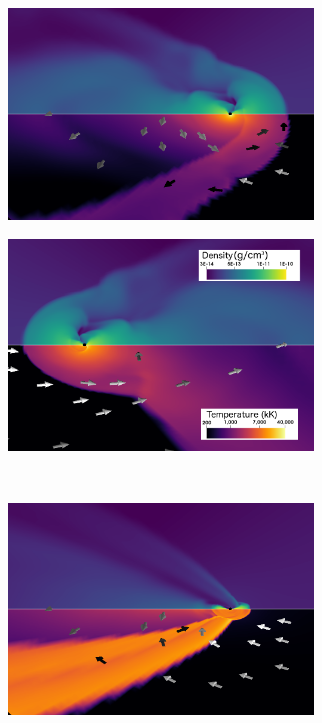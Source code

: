\documentclass{aa}
\begin{document}
\begin{figure}
\begin{subfigure}{0.5\textwidth}
\begin{center}
\includegraphics[width=8.1cm]{Pictures/isoS_1.png} 
\label{fig:subim1}
\end{center}
\end{subfigure}
\begin{subfigure}{0.5\textwidth}
\begin{center}
\includegraphics[width=8.1cm]{Pictures/isoS_2.png}
\label{fig:subim2}
\end{center}
\end{subfigure}
\vspace*{0.8cm}\\
\hspace*{-0.2cm}
\begin{subfigure}{0.5\textwidth}
\begin{center}
\includegraphics[width=8.1cm]{Pictures/isoHot_1.png}

\end{center}
\end{subfigure}
\end{figure}
\end{document}
